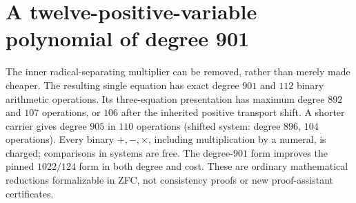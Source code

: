 \section{A twelve-positive-variable polynomial of degree 901}
\label{sec:positive901}
The inner radical-separating multiplier can be removed, rather than merely
made cheaper.  The resulting single equation has exact degree $901$ and
$112$ binary arithmetic operations.  Its three-equation presentation has
maximum degree $892$ and $107$ operations, or $106$ after the inherited
positive transport shift.  A shorter carrier gives degree $905$ in $110$
operations (shifted system: degree $896$, $104$ operations).
Every binary $+,-,\times$, including multiplication by a numeral, is charged;
comparisons in systems are free.  The degree-$901$ form improves the pinned
$1022/124$ form in both degree and cost.  These are ordinary mathematical
reductions formalizable in ZFC, not consistency proofs or new proof-assistant
certificates.

